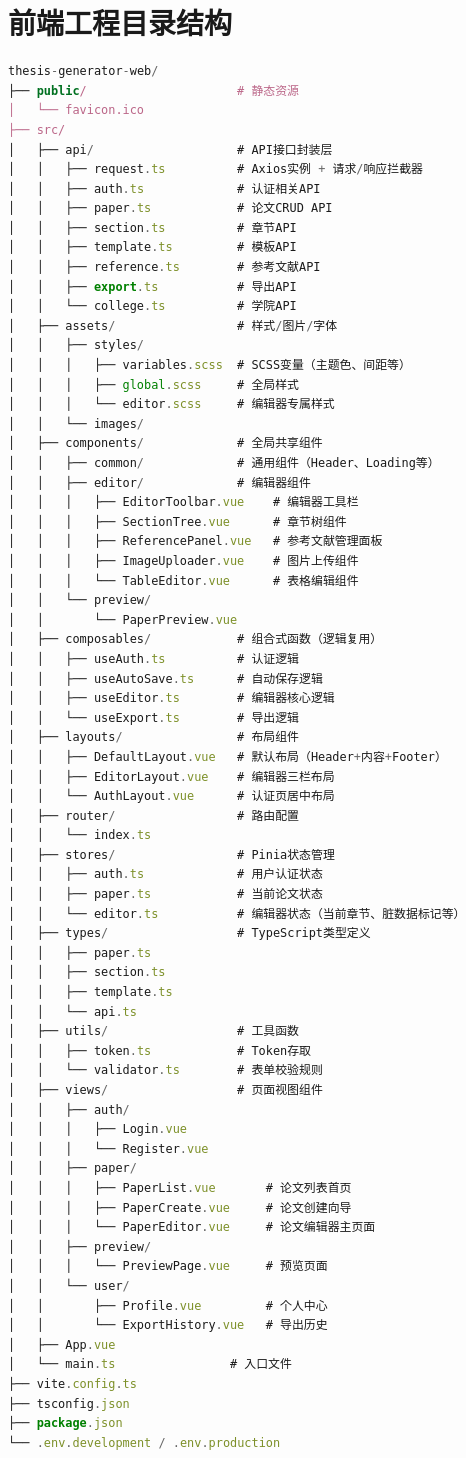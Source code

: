 \documentclass{../../softeng}
\begin{document}
\section{前端工程目录结构}

\begin{lstlisting}[language=JavaScript]
thesis-generator-web/
├── public/                     # 静态资源
│   └── favicon.ico
├── src/
│   ├── api/                    # API接口封装层
│   │   ├── request.ts          # Axios实例 + 请求/响应拦截器
│   │   ├── auth.ts             # 认证相关API
│   │   ├── paper.ts            # 论文CRUD API
│   │   ├── section.ts          # 章节API
│   │   ├── template.ts         # 模板API
│   │   ├── reference.ts        # 参考文献API
│   │   ├── export.ts           # 导出API
│   │   └── college.ts          # 学院API
│   ├── assets/                 # 样式/图片/字体
│   │   ├── styles/
│   │   │   ├── variables.scss  # SCSS变量（主题色、间距等）
│   │   │   ├── global.scss     # 全局样式
│   │   │   └── editor.scss     # 编辑器专属样式
│   │   └── images/
│   ├── components/             # 全局共享组件
│   │   ├── common/             # 通用组件（Header、Loading等）
│   │   ├── editor/             # 编辑器组件
│   │   │   ├── EditorToolbar.vue    # 编辑器工具栏
│   │   │   ├── SectionTree.vue      # 章节树组件
│   │   │   ├── ReferencePanel.vue   # 参考文献管理面板
│   │   │   ├── ImageUploader.vue    # 图片上传组件
│   │   │   └── TableEditor.vue      # 表格编辑组件
│   │   └── preview/
│   │       └── PaperPreview.vue
│   ├── composables/            # 组合式函数（逻辑复用）
│   │   ├── useAuth.ts          # 认证逻辑
│   │   ├── useAutoSave.ts      # 自动保存逻辑
│   │   ├── useEditor.ts        # 编辑器核心逻辑
│   │   └── useExport.ts        # 导出逻辑
│   ├── layouts/                # 布局组件
│   │   ├── DefaultLayout.vue   # 默认布局（Header+内容+Footer）
│   │   ├── EditorLayout.vue    # 编辑器三栏布局
│   │   └── AuthLayout.vue      # 认证页居中布局
│   ├── router/                 # 路由配置
│   │   └── index.ts
│   ├── stores/                 # Pinia状态管理
│   │   ├── auth.ts             # 用户认证状态
│   │   ├── paper.ts            # 当前论文状态
│   │   └── editor.ts           # 编辑器状态（当前章节、脏数据标记等）
│   ├── types/                  # TypeScript类型定义
│   │   ├── paper.ts
│   │   ├── section.ts
│   │   ├── template.ts
│   │   └── api.ts
│   ├── utils/                  # 工具函数
│   │   ├── token.ts            # Token存取
│   │   └── validator.ts        # 表单校验规则
│   ├── views/                  # 页面视图组件
│   │   ├── auth/
│   │   │   ├── Login.vue
│   │   │   └── Register.vue
│   │   ├── paper/
│   │   │   ├── PaperList.vue       # 论文列表首页
│   │   │   ├── PaperCreate.vue     # 论文创建向导
│   │   │   └── PaperEditor.vue     # 论文编辑器主页面
│   │   ├── preview/
│   │   │   └── PreviewPage.vue     # 预览页面
│   │   └── user/
│   │       ├── Profile.vue         # 个人中心
│   │       └── ExportHistory.vue   # 导出历史
│   ├── App.vue
│   └── main.ts                # 入口文件
├── vite.config.ts
├── tsconfig.json
├── package.json
└── .env.development / .env.production
\end{lstlisting}
\end{document}
